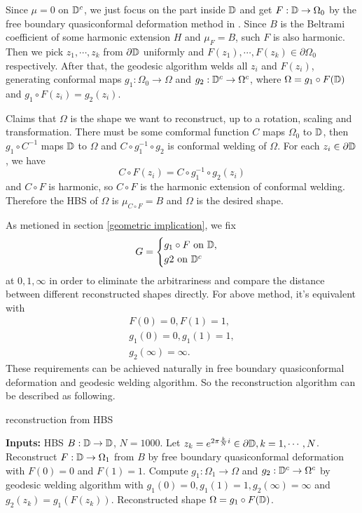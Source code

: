 \documentclass[review,onefignum,onetabnum]{siamonline190516}
\begin{document}
    Since $\mu=0$ on $\mathbb{D}^c$, we just focus on the part inside $\mathbb{D}$ and get $F: \mathbb{D} \rightarrow \Omega_0$ by the free boundary quasiconformal deformation method in \cite{choi2020shape}. Since $B$ is the Beltrami coefficient of some harmonic extension $H$ and $\mu_F = B$, such $F$ is also harmonic. Then we pick $z_1, \cdots, z_k$ from $\partial \mathbb{D}$ uniformly and $F(z_1), \cdots, F(z_k) \in \partial \Omega_0$ respectively. After that, the geodesic algorithm \cite{marshall2009lens} welds all $z_i$ and $F(z_i)$, generating conformal maps $g_1 : \Omega_0 \rightarrow \Omega$ and $g_2: \mathbb{D}^c \rightarrow \Omega^c$, where $\Omega = g_1 \circ F (\mathbb{D})$ and $g_1 \circ F(z_i) = g_2(z_i)$.
    
    Claims that $\Omega$ is the shape we want to reconstruct, up to a rotation, scaling and transformation. There must be some comformal function $C$ maps $\Omega_0$ to $\mathbb{D}$, then $g_1 \circ C^{-1}$ maps $\mathbb{D}$ to $\Omega$ and $C \circ g_1^{-1} \circ g_2$ is conformal welding of $\Omega$. For each $z_i \in \partial \mathbb{D}$, we have
    $$C \circ F(z_i) = C \circ g_1^{-1} \circ g_2(z_i)$$
    and $C \circ F$ is harmonic, so $C \circ F$ is the harmonic extension of conformal welding. Therefore the HBS of $\Omega$ is $\mu_{C \circ F} = B$ and $\Omega$ is the desired shape.

    As metioned in section \ref{geometric implication}, we fix
    \begin{equation*}
        G = \begin{cases}
            g_1 \circ F \text{ on } \mathbb{D},\\
            g2 \text{ on } \mathbb{D}^c
        \end{cases}
    \end{equation*}
    at $0, 1, \infty$ in order to eliminate the arbitrariness and compare the distance between different reconstructed shapes directly. For above method, it's equivalent with
    \begin{gather*}
        F(0) = 0, F(1) = 1,\\
        g_1(0) = 0, g_1(1) = 1,\\
        g_2(\infty) = \infty.
    \end{gather*}
    These requirements can be achieved naturally in free boundary quasiconformal deformation and geodesic welding algorithm. So the reconstruction algorithm can be described as following.

    \begin{algorithm}[H]
    \caption{reconstruction from HBS}
    \label{reconstruction algo}
    \begin{algorithmic}
        \STATE \textbf{Inputs:} HBS $B: \mathbb{D} \rightarrow \mathbb{D}$, $N=1000$.
        \STATE Let $z_k=e^{2\pi\frac{k}{N}i}\in \partial \mathbb{D}, k=1,\cdots, N$.
        \STATE Reconstruct $F: \mathbb{D} \rightarrow \Omega_1$ from $B$ by free boundary quasiconformal deformation with $F(0)=0$ and $F(1)=1$.
        \STATE Compute $g_1: \Omega_1 \rightarrow \Omega$ and $g_2: \mathbb{D}^c \rightarrow \Omega^c$ by geodesic welding algorithm with $g_1(0) = 0, g_1(1) = 1, g_2(\infty) = \infty$ and $g_2(z_k) = g_1(F(z_k))$.
        \RETURN Reconstructed shape $\Omega = g_1 \circ F(\mathbb{D})$.
    \end{algorithmic}
    \end{algorithm}
\end{document}
